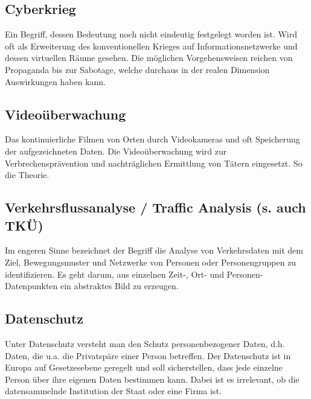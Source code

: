 \subsection{
Cyberkrieg 
}
Ein Begriff, dessen Bedeutung noch nicht eindeutig festgelegt worden 
ist. Wird oft als Erweiterung des konventionellen Krieges auf 
Informationsnetzwerke und dessen virtuellen R\"aume gesehen. Die 
m\"oglichen Vorgehensweisen reichen von Propaganda bis zur Sabotage, 
welche durchaus in der realen Dimension Auswirkungen haben kann. 

\subsection{
Video\"uberwachung 
}
Das kontinuierliche Filmen von Orten durch Videokameras und oft 
Speicherung der aufgezeichneten Daten. Die Video\"uberwachung wird zur 
Verbrechenspr\"avention und nachtr\"aglichen Ermittlung von T\"atern 
eingesetzt. So die Theorie. 

\subsection{
Verkehrsflussanalyse / Traffic Analysis (s. auch TK\"U) 
}
Im engeren Sinne bezeichnet der Begriff die Analyse von Verkehrsdaten 
mit dem Ziel, Bewegungsmuster und Netzwerke von Personen oder 
Personengruppen zu identifizieren. Es geht darum, aus einzelnen Zeit-, 
Ort- und Personen-Datenpunkten ein abstraktes Bild zu erzeugen. 

\subsection{
Datenschutz 
}
Unter Datenschutz versteht man den Schutz personenbezogener Daten, d.h. 
Daten, die u.a. die Privatsp\"are einer Person betreffen. Der 
Datenschutz ist in Europa auf Gesetzesebene geregelt und soll 
sicherstellen, dass jede einzelne Person \"uber ihre eigenen Daten 
bestimmen kann. Dabei ist es irrelevant, ob die datensammelnde 
Institution der Staat oder eine Firma ist. 
